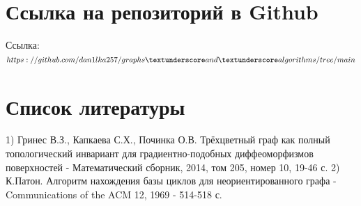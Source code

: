 	\section{Ссылка на репозиторий в Github}
	Ссылка: $https://github.com/dan1lka257/graphs \textunderscore and \textunderscore algorithms/tree/main$
	\section{Список литературы}
	1) Гринес В.З., Капкаева С.Х., Починка О.В. Трёхцветный граф как полный топологический инвариант для градиентно-подобных диффеоморфизмов поверхностей - Математический сборник, 2014, том 205, номер 10, 19-46 с.
	2) К.Патон. Алгоритм нахождения базы циклов для неориентированного графа - Communications of the ACM 12, 1969 - 514-518 с.
